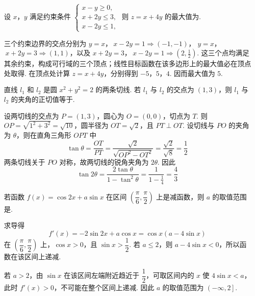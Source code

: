 \begin{problem}
设 \(x\)，\(y\) 满足约束条件 \(\begin{cases}
x-y\geqslant 0,\\
x+2y\leqslant 3,\\
x-2y\leqslant 1,
\end{cases}\) 则 \(z=x+4y\) 的最大值为\fillinblank{}.

\begin{solution}
三个约束边界的交点分别为
\(y=x\)，\(\ x-2y=1\Longrightarrow(-1,-1)\)，
\(y=x\)，\(\ x+2y=3\Longrightarrow(1,1)\)，以及
\(x+2y=3\)，\(\ x-2y=1\Longrightarrow\left(2,\frac12\right)\).
这三个点均满足其余约束，构成可行域的三个顶点；线性目标函数在该多边形上的最大值必在顶点处取得. 在顶点处计算
\(z=x+4y\)，分别得到 \(-5\)，\(5\)，\(4\). 因而最大值为 \(5\).
\end{solution}
\end{problem}

\begin{problem}
直线 \(l_{1}\) 和 \(l_{2}\) 是圆 \(x^{2}+y^{2}=2\) 的两条切线. 若 \(l_{1}\) 与 \(l_{2}\) 的交点为 \(\left(1,3\right)\)，则 \(l_{1}\) 与 \(l_{2}\) 的夹角的正切值等于\fillinblank{}.

\begin{solution}
设两切线的交点为 \(P=(1,3)\)，圆心为 \(O=(0,0)\)，切点为 \(T\). 则
\(OP=\sqrt{1^{2}+3^{2}}=\sqrt{10}\)，圆半径为 \(OT=\sqrt2\)，且
\(PT\perp OT\). 设切线与 \(PO\) 的夹角为 \(\theta\)，则在直角三角形
\(OPT\) 中
\[
\tan\theta=\frac{OT}{PT}
=\frac{\sqrt2}{\sqrt{OP^{2}-OT^{2}}}
=\frac{\sqrt2}{\sqrt8}=\frac12
\]
两条切线关于 \(PO\) 对称，故两切线的锐角夹角为 \(2\theta\). 因此
\[
\tan 2\theta=\frac{2\tan\theta}{1-\tan^{2}\theta}
=\frac{1}{1-\frac14}=\frac43
\]
\end{solution}
\end{problem}

\begin{problem}
若函数 \(f(x)=\cos 2x+a\sin x\) 在区间 \(\left(\dfrac{\pi}{6},\dfrac{\pi}{2}\right)\) 上是减函数，则 \(a\) 的取值范围是\fillinblank{}.
\answer{\(\left(-\infty,2\right]\)}

\begin{solution}
求导得
\[
f'(x)=-2\sin2x+a\cos x=\cos x\left(a-4\sin x\right)
\]
在 \(\left(\dfrac{\pi}{6},\dfrac{\pi}{2}\right)\) 上，\(\cos x>0\)，且
\(\sin x>\dfrac12\). 若 \(a\leqslant2\)，则
\(a-4\sin x<0\)，所以函数在该区间上递减.

若 \(a>2\)，由 \(\sin x\) 在该区间左端附近趋近于 \(\dfrac12\)，可取区间内的
\(x\) 使 \(4\sin x<a\)，此时 \(f'(x)>0\)，不可能在整个区间上递减.
因此 \(a\) 的取值范围为 \(\left(-\infty,2\right]\).
\end{solution}
\end{problem}

